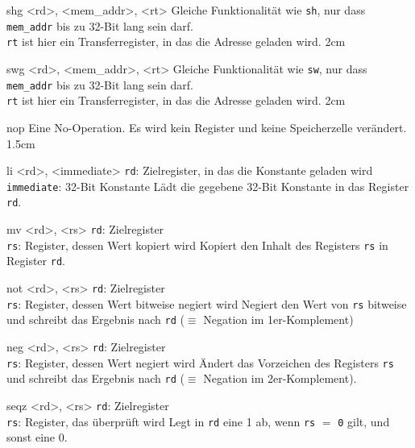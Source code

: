 \pseudoinsttwo
{
  shg <rd>, <mem\_addr>, <rt>
}
{
  Gleiche Funktionalität wie \texttt{sh}, nur dass \texttt{mem\_addr} bis zu 32-Bit lang sein darf.\\\texttt{rt} ist hier ein Transferregister, in das die Adresse geladen wird.
}
{2cm}

\pseudoinsttwo
{
  swg <rd>, <mem\_addr>, <rt>
}
{
  Gleiche Funktionalität wie \texttt{sw}, nur dass \texttt{mem\_addr} bis zu 32-Bit lang sein darf.\\\texttt{rt} ist hier ein Transferregister, in das die Adresse geladen wird.
}
{2cm}

\pseudoinsttwo
{
  nop
}
{
  Eine No-Operation. Es wird kein Register und keine Speicherzelle verändert.
}
{1.5cm}

\pseudoinst
{
  li <rd>, <immediate>
}
{
  \texttt{rd}: Zielregister, in das die Konstante geladen wird \\
  \texttt{immediate}: 32-Bit Konstante
}
{
  Lädt die gegebene 32-Bit Konstante in das Register \texttt{rd}.
}


\pseudoinst
{
  mv <rd>, <rs>
}
{
  \texttt{rd}: Zielregister \\
  \texttt{rs}: Register, dessen Wert kopiert wird
}
{
  Kopiert den Inhalt des Registers \texttt{rs} in Register \texttt{rd}.
}

\pseudoinst
{
  not <rd>, <rs>
}
{
  \texttt{rd}: Zielregister \\
  \texttt{rs}: Register, dessen Wert bitweise negiert wird
}
{
  Negiert den Wert von \texttt{rs} bitweise und schreibt das Ergebnis nach
  \texttt{rd} ($\equiv$ Negation im 1er-Komplement)
}

\pseudoinst
{
  neg <rd>, <rs>
}
{
  \texttt{rd}: Zielregister \\
  \texttt{rs}: Register, dessen Wert negiert wird
}
{
  Ändert das Vorzeichen des Registers \texttt{rs} und schreibt das Ergebnis
  nach \texttt{rd} ($\equiv$ Negation im 2er-Komplement).
}

\pseudoinst
{
  seqz <rd>, <rs>
}
{
  \texttt{rd}: Zielregister \\
  \texttt{rs}: Register, das überprüft wird
}
{
  Legt in \texttt{rd} eine 1 ab, wenn \texttt{rs} $=$ \texttt{0} gilt, und
  sonst eine 0.
}

